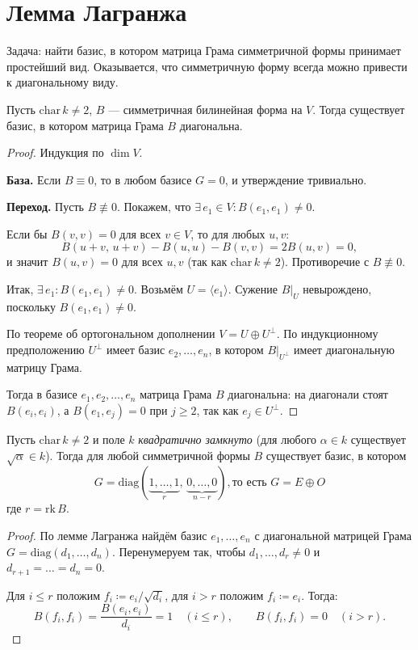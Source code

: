 \section{Лемма Лагранжа}

Задача: найти базис, в котором матрица Грама симметричной формы принимает простейший вид.
Оказывается, что симметричную форму всегда можно привести к диагональному виду.

\begin{lemma}[Лагранжа]
    Пусть $\mathrm{char}\, k \neq 2$, $B$ --- симметричная билинейная форма на $V$.
    Тогда существует базис, в котором матрица Грама $B$ диагональна.

    \begin{proof}
        Индукция по $\dim V$.

        \textbf{База.} Если $B \equiv 0$, то в любом базисе $G = 0$, и утверждение тривиально.

        \textbf{Переход.} Пусть $B \not\equiv 0$. Покажем, что $\exists\, e_1 \in V\colon B(e_1, e_1) \neq 0$.

        Если бы $B(v, v) = 0$ для всех $v \in V$, то для любых $u, v$:
        \[
            B(u + v,\, u + v) - B(u, u) - B(v, v) = 2B(u, v) = 0,
        \]
        и значит $B(u, v) = 0$ для всех $u, v$ (так как $\mathrm{char}\, k \neq 2$). Противоречие с $B \not\equiv 0$.

        Итак, $\exists\, e_1\colon B(e_1, e_1) \neq 0$.
        Возьмём $U = \langle e_1 \rangle$. Сужение $B\big|_U$ невырождено, поскольку $B(e_1, e_1) \neq 0$.

        По теореме об ортогональном дополнении $V = U \oplus U^\perp$.
        По индукционному предположению $U^\perp$ имеет базис $e_2, \dots, e_n$, в котором $B\big|_{U^\perp}$ имеет диагональную матрицу Грама.

        Тогда в базисе $e_1, e_2, \dots, e_n$ матрица Грама $B$ диагональна:
        на диагонали стоят $B(e_i, e_i)$, а $B(e_1, e_j) = 0$ при $j \geq 2$, так как $e_j \in U^\perp$.
    \end{proof}
\end{lemma}


\begin{cor}
    Пусть $\mathrm{char}\, k \neq 2$ и поле $k$ \emph{квадратично замкнуто} (для любого $\alpha \in k$ существует
    $\sqrt{\alpha} \in k$).
    Тогда для любой симметричной формы $B$ существует базис, в котором
    \[
        G = \mathrm{diag}(\underbrace{1, \dots, 1}_{r},\, \underbrace{0, \dots, 0}_{n - r}), \text{то есть }
        G = E \oplus O
    \]
    где $r = \mathrm{rk}\, B$.
    \begin{proof}
        По лемме Лагранжа найдём базис $e_1, \dots, e_n$ с диагональной матрицей Грама $G = \mathrm{diag}(d_1, \dots, d_n)$.
        Перенумеруем так, чтобы $d_1, \dots, d_r \neq 0$ и $d_{r+1} = \dots = d_n = 0$.

        Для $i \leq r$ положим $f_i \coloneqq e_i / \sqrt{d_i}$, для $i > r$ положим $f_i \coloneqq e_i$. Тогда:
        \[
            B(f_i, f_i) = \frac{B(e_i, e_i)}{d_i} = 1 \quad (i \leq r), \qquad B(f_i, f_i) = 0 \quad (i > r).
        \]
    \end{proof}
\end{cor}


